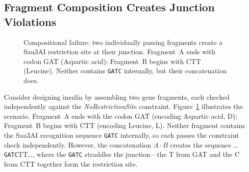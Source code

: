 \subsection{Fragment Composition Creates Junction Violations}

\begin{figure}[t]
\centering
{}
\caption{Compositional failure: two individually passing fragments
         create a Sau3AI restriction site at their junction.
         Fragment~A ends with codon GAT (Aspartic acid); Fragment~B
         begins with CTT (Leucine). Neither contains \texttt{GATC}
         internally, but their concatenation does.}
\label{fig:junction}
\end{figure}

Consider designing insulin by assembling two gene fragments, each
checked independently against the \emph{NoRestrictionSite} constraint.
Figure~\ref{fig:junction} illustrates the scenario.
Fragment~A ends with the codon GAT (encoding Aspartic acid, D);
Fragment~B begins with CTT (encoding Leucine, L).
Neither fragment contains the Sau3AI recognition sequence
\texttt{GATC} internally, so each passes the constraint check
independently.
However, the concatenation $A \cdot B$ creates the sequence
\dots\texttt{GATC}TT\dots, where the \texttt{GATC} straddles the
junction---the T from GAT and the C from CTT together form the
restriction site.

